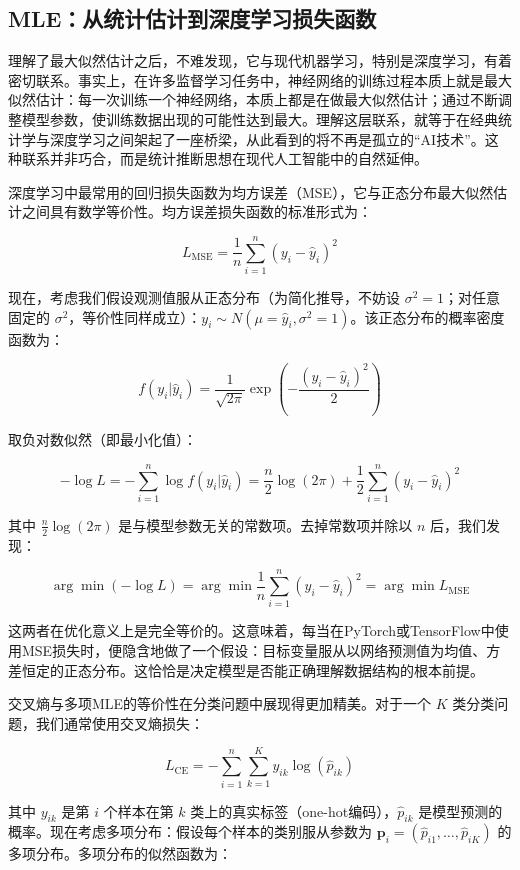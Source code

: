 \documentclass[
  twoside,12pt,fontset=none]{ctexbook}
\begin{document}
\hypertarget{mleux4eceux7edfux8ba1ux4f30ux8ba1ux5230ux6df1ux5ea6ux5b66ux4e60ux635fux5931ux51fdux6570}{%
\subsection{MLE：从统计估计到深度学习损失函数}\label{mleux4eceux7edfux8ba1ux4f30ux8ba1ux5230ux6df1ux5ea6ux5b66ux4e60ux635fux5931ux51fdux6570}}

理解了最大似然估计之后，不难发现，它与现代机器学习，特别是深度学习，有着密切联系。事实上，在许多监督学习任务中，神经网络的训练过程本质上就是最大似然估计：每一次训练一个神经网络，本质上都是在做最大似然估计；通过不断调整模型参数，使训练数据出现的可能性达到最大。理解这层联系，就等于在经典统计学与深度学习之间架起了一座桥梁，从此看到的将不再是孤立的``AI技术''。这种联系并非巧合，而是统计推断思想在现代人工智能中的自然延伸。

深度学习中最常用的回归损失函数为均方误差（MSE），它与正态分布最大似然估计之间具有数学等价性。均方误差损失函数的标准形式为：

\[L_{\text{MSE}} = \frac{1}{n} \sum_{i=1}^{n} (y_i - \hat{y}_i)^2\]

现在，考虑我们假设观测值服从正态分布（为简化推导，不妨设 \(\sigma^2 = 1\)；对任意固定的 \(\sigma^2\)，等价性同样成立）：\(y_i \sim N(\mu = \hat{y}_i, \sigma^2 = 1)\)。该正态分布的概率密度函数为：

\[f(y_i | \hat{y}_i) = \frac{1}{\sqrt{2\pi}} \exp\left(-\frac{(y_i - \hat{y}_i)^2}{2}\right)\]

取负对数似然（即最小化值）：

\[-\log L = -\sum_{i=1}^{n} \log f(y_i | \hat{y}_i) = \frac{n}{2}\log(2\pi) + \frac{1}{2}\sum_{i=1}^{n} (y_i - \hat{y}_i)^2\]

其中 \(\frac{n}{2}\log(2\pi)\) 是与模型参数无关的常数项。去掉常数项并除以 \(n\) 后，我们发现：

\[\arg\min (-\log L) = \arg\min \frac{1}{n}\sum_{i=1}^{n} (y_i - \hat{y}_i)^2 = \arg\min L_{\text{MSE}}\]

这两者在优化意义上是完全等价的。这意味着，每当在PyTorch或TensorFlow中使用MSE损失时，便隐含地做了一个假设：目标变量服从以网络预测值为均值、方差恒定的正态分布。这恰恰是决定模型是否能正确理解数据结构的根本前提。

交叉熵与多项MLE的等价性在分类问题中展现得更加精美。对于一个 \(K\) 类分类问题，我们通常使用交叉熵损失：

\[L_{\text{CE}} = -\sum_{i=1}^{n} \sum_{k=1}^{K} y_{ik} \log(\hat{p}_{ik})\]

其中 \(y_{ik}\) 是第 \(i\) 个样本在第 \(k\) 类上的真实标签（one-hot编码），\(\hat{p}_{ik}\) 是模型预测的概率。现在考虑多项分布：假设每个样本的类别服从参数为 \(\mathbf{p}_i = (\hat{p}_{i1}, \ldots, \hat{p}_{iK})\) 的多项分布。多项分布的似然函数为：
\end{document}
